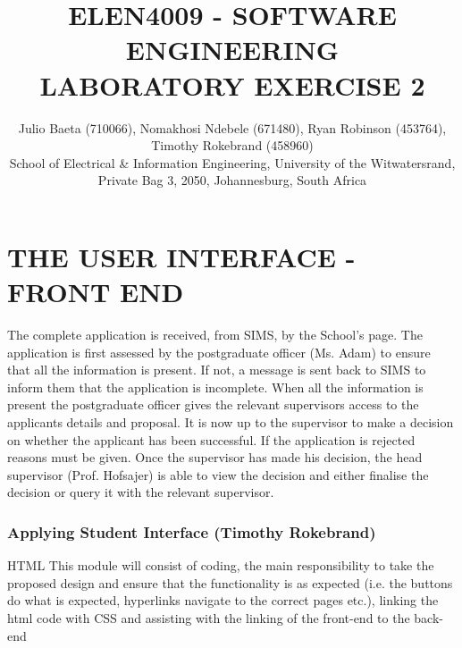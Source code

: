 \documentclass[journal,comsoc]{IEEEtran}
\begin{document}
\title{ELEN4009 - SOFTWARE ENGINEERING\\ LABORATORY EXERCISE 2}

\author{\vspace{3mm} Julio Baeta (710066), Nomakhosi Ndebele (671480), Ryan Robinson (453764), Timothy Rokebrand (458960)\\ \small \vspace{2mm} School of Electrical \& Information Engineering, University of the Witwatersrand, Private Bag 3, 2050, Johannesburg, South Africa
}

\markboth{}{}

\maketitle

\thispagestyle{empty}
\pagestyle{empty}

\IEEEpeerreviewmaketitle


\section{THE USER INTERFACE - FRONT END}

\hfill \break The complete application is received, from SIMS, by the School's page. The application is first assessed by the postgraduate officer (Ms. Adam) to ensure that all the information is present. If not, a message is sent back to SIMS to inform them that the application is incomplete. When all the information is present the postgraduate officer gives the relevant supervisors access to the applicants details and proposal. It is now up to the supervisor to make a decision on whether the applicant has been successful. If the application is rejected reasons must be given. Once the supervisor has made his decision, the head supervisor (Prof. Hofsajer) is able to view the decision and either finalise the decision or query it with the relevant supervisor. \break


\subsubsection{Applying Student Interface (Timothy Rokebrand)}

\hfill \break HTML This module will consist of coding, the main responsibility to take the proposed design and ensure that the functionality is as expected (i.e. the buttons do what is expected, hyperlinks navigate to the correct pages etc.), linking the html code with CSS and assisting with the linking of the front-end to the back-end
\vspace{2mm}
\end{document}
